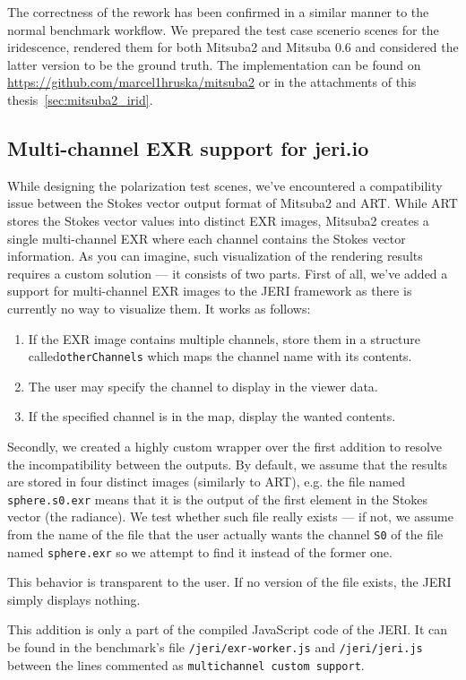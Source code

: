The correctness of the rework has been confirmed in a similar manner to the normal benchmark workflow. We prepared the test case scenerio scenes for the iridescence, rendered them for both Mitsuba2 and Mitsuba 0.6 and considered the latter version to be the ground truth. The implementation can be found on \url{https://github.com/marcel1hruska/mitsuba2} or in the attachments of this thesis~\ref{sec:mitsuba2_irid}.

\subsection{Multi-channel EXR support for jeri.io}
\label{sec:jeri}

While designing the polarization test scenes, we've encountered a compatibility issue between the Stokes vector output format of Mitsuba2 and ART. While ART stores the Stokes vector values into distinct EXR images, Mitsuba2 creates a single multi-channel EXR where each channel contains the Stokes vector information. As you can imagine, such visualization of the rendering results requires a custom solution --- it consists of two parts. First of all, we've added a support for multi-channel EXR images to the JERI framework as there is currently no way to visualize them. It works as follows:

\begin{enumerate}
	\item If the EXR image contains multiple channels, store them in a structure called\texttt{otherChannels} which maps the channel name with its contents.
	\item The user may specify the channel to display in the viewer data.
	\item If the specified channel is in the map, display the wanted contents.
\end{enumerate}

Secondly, we created a highly custom wrapper over the first addition to resolve the incompatibility between the outputs. By default, we assume that the results are stored in four distinct images (similarly to ART), e.g. the file named \texttt{sphere.s0.exr} means that it is the output of the first element in the Stokes vector (the radiance). We test whether such file really exists --- if not, we assume from the name of the file that the user actually wants the channel \texttt{S0} of the file named \texttt{sphere.exr} so we attempt to find it instead of the former one.

This behavior is transparent to the user. If no version of the file exists, the JERI simply displays nothing.

This addition is only a part of the compiled JavaScript code of the JERI. It can be found in the benchmark's file \texttt{/jeri/exr-worker.js} and \texttt{/jeri/jeri.js} between the lines commented as \texttt{multichannel custom support}.